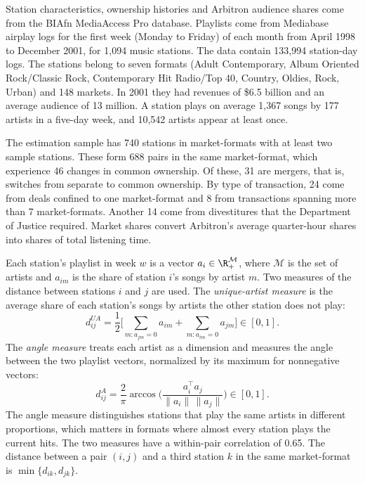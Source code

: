 Station characteristics, ownership histories and Arbitron audience shares come from the BIAfn MediaAccess Pro
database. Playlists come from Mediabase airplay logs for the first week (Monday to Friday) of each month from April
1998 to December 2001, for 1,094 music stations. The data contain 133,994 station-day logs. The stations belong to
seven formats (Adult Contemporary, Album Oriented Rock/Classic Rock, Contemporary Hit Radio/Top 40, Country, Oldies,
Rock, Urban) and 148 markets. In 2001 they had revenues of \$6.5 billion and an average audience of 13 million. A
station plays on average 1,367 songs by 177 artists in a five-day week, and 10,542 artists appear at least once.

The estimation sample has 740 stations in market-formats with at least two sample stations. These form 688 pairs in
the same market-format, which experience 46 changes in common ownership. Of these, 31 are mergers, that is, switches
from separate to common ownership. By type of transaction, 24 come from deals confined to one market-format and 8 from
transactions spanning more than 7 market-formats. Another 14 come from divestitures that the Department of Justice
required. Market shares convert Arbitron's average quarter-hour
shares into shares of total listening time.

Each station's playlist in week $w$ is a vector $a_i \in \R^{\mathcal{M}}_+$, where $\mathcal{M}$ is the set of artists
and $a_{im}$ is the share of station $i$'s songs by artist $m$. Two measures of the distance between stations $i$ and
$j$ are used. The \emph{unique-artist measure} is the average share of each station's songs by artists the other
station does not play:
\begin{equation}\label{eq:11-sw-ua}
d^{UA}_{ij} = \frac{1}{2}\Big[\sum_{m : a_{jm} = 0} a_{im} + \sum_{m : a_{im} = 0} a_{jm}\Big] \in [0, 1].
\end{equation}
The \emph{angle measure} treats each artist as a dimension and measures the angle between the two playlist vectors,
normalized by its maximum for nonnegative vectors:
\begin{equation}\label{eq:11-sw-angle}
d^{A}_{ij} = \frac{2}{\pi}\arccos\Big(\frac{a_i^{\top}a_j}{\lVert a_i\rVert\,\lVert a_j\rVert}\Big) \in [0, 1].
\end{equation}
The angle measure distinguishes stations that play the same artists in different proportions, which matters in
formats where almost every station plays the current hits. The two measures have a within-pair correlation of 0.65.
The distance between a pair $(i,j)$ and a third station $k$ in the same market-format is $\min\{d_{ik}, d_{jk}\}$.

